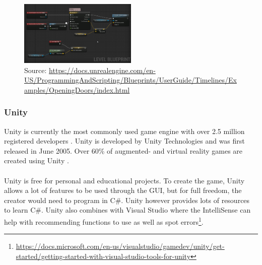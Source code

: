 \begin{figure}[H] 
    \centering
    \includegraphics[width=0.5\textwidth]{OtherImages/UEBlueprint.png}
    \caption{Source: \url{https://docs.unrealengine.com/en-US/ProgrammingAndScripting/Blueprints/UserGuide/Timelines/Examples/OpeningDoors/index.html}}    \label{UnrealEngineBlueprint}

\end{figure}

\subsubsection{Unity}
Unity is currently the most commonly used game engine with over 2.5 million registered developers \cite{Unity_arnia_software}. Unity is developed by Unity Technologies and was first released in June 2005.  Over 60\% of augmented- and virtual reality games are created using Unity \cite{GameEngine_UnityGame_book}. 
\\~\\
Unity is free for personal and educational projects. To create the game, Unity allows a lot of features to be used through the GUI, but for full freedom, the creator would need to program in C\#. Unity however provides lots of resources to learn C\#. Unity also combines with Visual Studio where the IntelliSense can help with recommending functions to use as well as spot errors\footnote{\url{https://docs.microsoft.com/en-us/visualstudio/gamedev/unity/get-started/getting-started-with-visual-studio-tools-for-unity}}.


